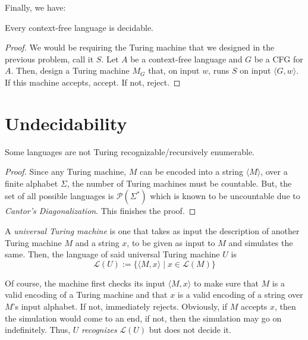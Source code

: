 Finally, we have:
\begin{theorem}
    Every context-free language is decidable.
\end{theorem}
\begin{proof}
    We would be requiring the Turing machine that we designed in the previous problem, call it $S$. Let $A$ be a context-free language and $G$ be a CFG for $A$. Then, design a Turing machine $M_G$ that, on input $w$, runs $S$ on input $\langle G, w\rangle$. If this machine accepts, accept. If not, reject.
\end{proof}

\section{Undecidability}
\begin{proposition}
    Some languages are not Turing recognizable/recursively enumerable.
\end{proposition}
\begin{proof}
    Since any Turing machine, $M$ can be encoded into a string $\langle M\rangle$, over a finite alphabet $\Sigma$, the number of Turing machines must be countable. But, the set of all possible languages is $\mathcal{P}(\Sigma^*)$ which is known to be uncountable due to \textit{Cantor's Diagonalization}. This finishes the proof.
\end{proof}

\begin{definition}
    A \textit{universal Turing machine} is one that takes as input the description of another Turing machine $M$ and a string $x$, to be given as input to $M$ and simulates the same. Then, the language of said universal Turing machine $U$ is 
    \begin{equation*}
        \mathcal{L}(U) := \{\langle M, x\rangle\mid x\in\mathcal{L}(M)\}
    \end{equation*}
\end{definition}

Of course, the machine first checks its input $\langle M,x\rangle$ to make sure that $M$ is a valid encoding of a Turing machine and that $x$ is a valid encoding of a string over $M$'s input alphabet. If not, immediately rejects. Obviously, if $M$ accepts $x$, then the simulation would come to an end, if not, then the simulation may go on indefinitely. Thus, $U$ \textit{recognizes} $\mathcal{L}(U)$ but does not decide it.

